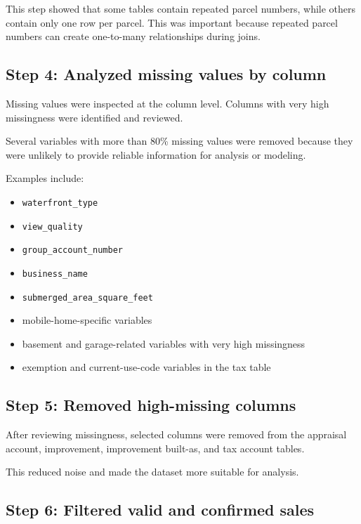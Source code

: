 \documentclass[
  english,
  letterpaper,
  DIV=11,
  numbers=noendperiod]{scrreprt}
\begin{document}
This step showed that some tables contain repeated parcel numbers, while
others contain only one row per parcel. This was important because
repeated parcel numbers can create one-to-many relationships during
joins.

\subsection{Step 4: Analyzed missing values by
column}\label{step-4-analyzed-missing-values-by-column}

Missing values were inspected at the column level. Columns with very
high missingness were identified and reviewed.

Several variables with more than 80\% missing values were removed
because they were unlikely to provide reliable information for analysis
or modeling.

Examples include:

\begin{itemize}
\item
  \texttt{waterfront\_type}
\item
  \texttt{view\_quality}
\item
  \texttt{group\_account\_number}
\item
  \texttt{business\_name}
\item
  \texttt{submerged\_area\_square\_feet}
\item
  mobile-home-specific variables
\item
  basement and garage-related variables with very high missingness
\item
  exemption and current-use-code variables in the tax table
\end{itemize}

\subsection{Step 5: Removed high-missing
columns}\label{step-5-removed-high-missing-columns}

After reviewing missingness, selected columns were removed from the
appraisal account, improvement, improvement built-as, and tax account
tables.

This reduced noise and made the dataset more suitable for analysis.

\subsection{Step 6: Filtered valid and confirmed
sales}\label{step-6-filtered-valid-and-confirmed-sales}
\end{document}
